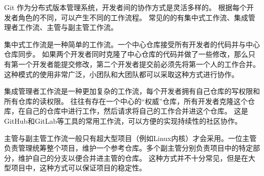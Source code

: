 \documentclass[../main.tex]{subfiles}
\begin{document}
Git 作为分布式版本管理系统，开发者间的协作方式是灵活多样的。
根据每个开发者角色的不同，可以产生不同的工作流程。
常见的的有集中式工作流、集成管理者工作流、主管与副主管工作流。

集中式工作流是一种简单的工作流。一个中心仓库接受所有开发者的代码并与中心仓库同步。
如果两个开发者同时克隆了中心仓库的代码并做了一些修改，那么只有第一个开发者能提交修改，第二个开发者提交前必须先将第一个人的工作合并。
这种模式的使用非常广泛，小团队和大团队都可以采取这种方式进行协作。

集成管理者工作流是一种更加复杂的工作流，每个开发者拥有自己仓库的写权限和所有仓库的读权限。
往往有存在一个中心的“权威”仓库，所有开发者克隆这个仓库，在自己的仓库中进行工作，然后请求将自己的工作合并进这个仓库。
这是GitHub和GitLab等工具的常用工作流，可以方便的实现持续性的社区协作。

主管与副主管工作流一般只有超大型项目（例如Linux内核）才会采用。一位主管负责管理统筹整个项目，维护一个参考仓库。多个副主管分别负责项目中的特定部分，维护自己的分支以便合并进主管的仓库。
这种方式并不十分常见，但是在大型项目中，这种方式可以保证项目的稳定性。
\end{document}
